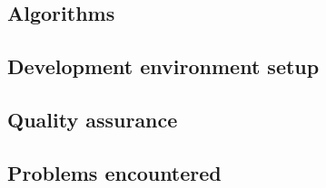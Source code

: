 \subsection{Algorithms}

\subsection{Development environment setup}

\subsection{Quality assurance}

\subsection{Problems encountered}

